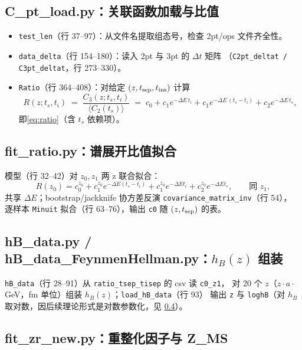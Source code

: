 \documentclass[UTF8,11pt]{ctexart}
\begin{document}
\subsection{C\_pt\_load.py：关联函数加载与比值}
\label{sec:c_pt_load}

\begin{itemize}
  \item \texttt{test\_len}（行 37--97）：从文件名提取组态号，检查 2pt/ops 文件齐全性。
  \item \texttt{data\_delta}（行 154--180）：读入 2pt 与 3pt 的 $\Delta t$ 矩阵
  （\texttt{C2pt\_deltat / C3pt\_deltat}，行 273--330）。
  \item \texttt{Ratio}（行 364--408）：对给定 $(z, t_{\rm sep}, t_{\rm ins})$ 计算
  \begin{equation*}
    R(z;t_s,t_i)\;=\;\frac{C_3(z;t_s,t_i)}{\big\langle C_2(t_s)\big\rangle}
    \;=\;c_0 + c_1 e^{-\Delta E\,t_i} + c_1 e^{-\Delta E\,(t_s-t_i)} + c_2 e^{-\Delta E\,t_s},
  \end{equation*}
  即\eqref{eq:ratio}（含 $t_s$ 依赖项）。
\end{itemize}

\subsection{fit\_ratio.py：谱展开比值拟合}
\label{sec:fit_ratio}

模型（行 32--42）对 $z_0,z_1$ 两 z 联合拟合：
\begin{equation}
  R(z_0) = c_0^{z_0}+c_1^{z_0}e^{-\Delta E(t_s-t_i)}+c_1^{z_0}e^{-\Delta E t_i}+c_2^{z_0}e^{-\Delta E t_s},
  \qquad \text{同 } z_1,
\end{equation}
共享 $\Delta E$；bootstrap/jackknife 协方差反演 \texttt{covariance\_matrix\_inv}（行 54），
逐样本 \texttt{Minuit} 拟合（行 63--76），输出 \texttt{c0} 随 $(z, t_{\rm sep})$ 的表。

\subsection{hB\_data.py / hB\_data\_FeynmenHellman.py：$h_B(z)$ 组装}
\label{sec:hb_data}

\texttt{hB\_data}（行 28--91）从 \texttt{ratio\_tsep\_tisep} 的 csv 读 \texttt{c0\_z1}，
对 20 个 $z$（$z\cdot a\cdot$GeV，fm 单位）组装 $h_B(z)$；\texttt{load\_hB\_data}（行 93）
输出 \texttt{z} 与 \texttt{loghB}（对 $h_B$ 取对数，因后续理论形式是对数参数化，见 \ref{sec:zr}）。

\subsection{fit\_zr\_new.py：重整化因子与 Z\_MS}
\label{sec:zr}
\end{document}
